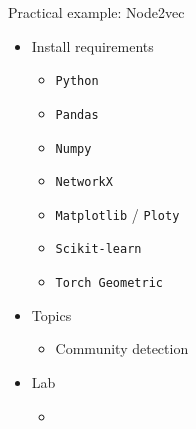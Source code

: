 \documentclass{beamer}
\begin{document}
        \begin{frame}{Practical example: Node2vec}
            \begin{itemize}
                \item Install requirements
                    \begin{itemize}
                        \item \texttt{Python}
                        \item \texttt{Pandas}
                        \item \texttt{Numpy}
                        \item \texttt{NetworkX}
                        \item \texttt{Matplotlib} / \texttt{Ploty}
                        \item \texttt{Scikit-learn}
                        \item \texttt{Torch Geometric}
                    \end{itemize}
                \item Topics 
                    \begin{itemize}
                        \item Community detection
                    \end{itemize}
                \item Lab
                    \begin{itemize}
                        \item              
                            \href{https://drive.google.com/file/d/1FkXYVMxq9TH_57hfl3nBMGsVH9fwZ6dC/view?usp=sharing}{
                            }
                    \end{itemize}
            \end{itemize}
        \end{frame}
\end{document}
